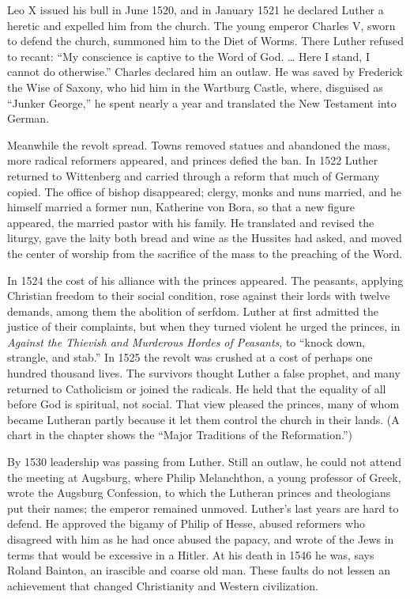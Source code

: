 Leo X issued his bull in June 1520, and in January 1521 he declared Luther a heretic and expelled him
from the church. The young emperor Charles V, sworn to defend the church, summoned him to the Diet of
Worms. There Luther refused to recant: ``My conscience is captive to the Word of God. \dots{} Here I
stand, I cannot do otherwise.'' Charles declared him an outlaw. He was saved by Frederick the Wise of
Saxony, who hid him in the Wartburg Castle, where, disguised as ``Junker George,'' he spent nearly a
year and translated the New Testament into German.

Meanwhile the revolt spread. Towns removed statues and abandoned the mass, more radical reformers
appeared, and princes defied the ban. In 1522 Luther returned to Wittenberg and carried through a
reform that much of Germany copied. The office of bishop disappeared; clergy, monks and
nuns married, and he himself married a former nun, Katherine von Bora, so that a new figure appeared,
the married pastor with his family. He translated and revised the liturgy, gave the laity both bread
and wine as the Hussites had asked, and moved the center of worship from the sacrifice of the mass to
the preaching of the Word.

In 1524 the cost of his alliance with the princes appeared. The peasants, applying Christian freedom
to their social condition, rose against their lords with twelve demands, among them the abolition of
serfdom. Luther at first admitted the justice of their complaints, but when they turned violent he
urged the princes, in \emph{Against the Thievish and Murderous Hordes of Peasants}, to ``knock down,
strangle, and stab.'' In 1525 the revolt was crushed at a cost of perhaps one hundred thousand lives.
The survivors thought Luther a false prophet, and many returned to Catholicism or joined the
radicals. He held that the equality of all before God is spiritual, not social. That view pleased the
princes, many of whom became Lutheran partly because it let them control the church in their lands.
(A chart in the chapter shows the ``Major Traditions of the Reformation.'')

By 1530 leadership was passing from Luther. Still an outlaw, he could not attend the meeting at
Augsburg, where Philip Melanchthon, a young professor of Greek, wrote the Augsburg Confession, to which the Lutheran princes and theologians put their names; the emperor remained unmoved. Luther's last years are
hard to defend. He approved the bigamy of Philip of Hesse, abused reformers who disagreed with him as
he had once abused the papacy, and wrote of the Jews in terms that would be excessive in a Hitler. At
his death in 1546 he was, says Roland Bainton, an irascible and coarse old man. These faults do not
lessen an achievement that changed Christianity and Western civilization.


